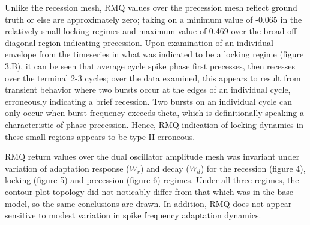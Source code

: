 \documentclass[12pt, letterpaper]{article}
\newenvironment{collapsable}{}{}
\begin{document}
\begin{collapsable}
  Unlike the recession mesh, RMQ values over the precession mesh reflect ground
  truth or else are approximately zero; taking on a minimum value of -0.065 in
  the relatively small locking regimes and maximum value of 0.469 over the broad
  off-diagonal region indicating precession. Upon examination of an individual
  envelope from the timeseries in what was indicated to be a locking regime
  (figure 3.B), it can be seen that average cycle spike phase first precesses, then recesses over
  the terminal 2-3 cycles; over the data examined, this appears to result from
  transient behavior where two bursts occur at the edges of an individual cycle,
  erroneously indicating a brief recession. Two bursts on an individual cycle
  can only occur when burst frequency exceeds theta, which is definitionally
  speaking a characteristic of phase precession. Hence, RMQ indication of
  locking dynamics in these small regions appears to be type II erroneous.

  \vspace{12pt}

  RMQ return values over the dual oscillator amplitude mesh was invariant
  under variation of adaptation response ($W_r$) and decay ($W_d$) for the
  recession (figure 4), locking (figure 5) and precession (figure 6) regimes. Under all three regimes, the
  contour plot topology did not noticably differ from that which was in the base
  model, so the same conclusions are drawn. In addition, RMQ does not appear
  sensitive to modest variation in spike frequency adaptation dynamics.

  \vspace{12pt}


\end{collapsable}
\end{document}
